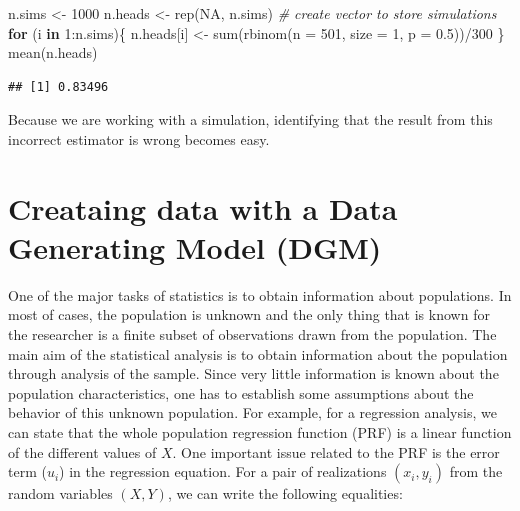 \documentclass[
]{book}
\newenvironment{Shaded}{\begin{snugshade}}{\end{snugshade}}
\newcommand{\AttributeTok}[1]{\textcolor[rgb]{0.77,0.63,0.00}{#1}}
\newcommand{\CommentTok}[1]{\textcolor[rgb]{0.56,0.35,0.01}{\textit{#1}}}
\newcommand{\ConstantTok}[1]{\textcolor[rgb]{0.00,0.00,0.00}{#1}}
\newcommand{\ControlFlowTok}[1]{\textcolor[rgb]{0.13,0.29,0.53}{\textbf{#1}}}
\newcommand{\DecValTok}[1]{\textcolor[rgb]{0.00,0.00,0.81}{#1}}
\newcommand{\FloatTok}[1]{\textcolor[rgb]{0.00,0.00,0.81}{#1}}
\newcommand{\FunctionTok}[1]{\textcolor[rgb]{0.00,0.00,0.00}{#1}}
\newcommand{\NormalTok}[1]{#1}
\newcommand{\OtherTok}[1]{\textcolor[rgb]{0.56,0.35,0.01}{#1}}
\newcommand{\SpecialCharTok}[1]{\textcolor[rgb]{0.00,0.00,0.00}{#1}}
\theoremstyle{definition}
\theoremstyle{definition}
\theoremstyle{definition}
\theoremstyle{definition}
\theoremstyle{remark}
\begin{document}
\begin{Shaded}
\begin{Highlighting}[]
\NormalTok{n.sims }\OtherTok{\textless{}{-}} \DecValTok{1000}
\NormalTok{n.heads }\OtherTok{\textless{}{-}} \FunctionTok{rep}\NormalTok{(}\ConstantTok{NA}\NormalTok{, n.sims) }\CommentTok{\# create vector to store simulations}
\ControlFlowTok{for}\NormalTok{ (i }\ControlFlowTok{in} \DecValTok{1}\SpecialCharTok{:}\NormalTok{n.sims)\{}
\NormalTok{  n.heads[i] }\OtherTok{\textless{}{-}} \FunctionTok{sum}\NormalTok{(}\FunctionTok{rbinom}\NormalTok{(}\AttributeTok{n =} \DecValTok{501}\NormalTok{, }\AttributeTok{size =} \DecValTok{1}\NormalTok{, }\AttributeTok{p =} \FloatTok{0.5}\NormalTok{))}\SpecialCharTok{/}\DecValTok{300}
\NormalTok{\}}
\FunctionTok{mean}\NormalTok{(n.heads)}
\end{Highlighting}
\end{Shaded}

\begin{verbatim}
## [1] 0.83496
\end{verbatim}

Because we are working with a simulation, identifying that the result from this incorrect estimator is wrong becomes easy.

\hypertarget{creataing-data-with-a-data-generating-model-dgm}{%
\section{Creataing data with a Data Generating Model (DGM)}\label{creataing-data-with-a-data-generating-model-dgm}}

One of the major tasks of statistics is to obtain information about populations. In most of cases, the population is unknown and the only thing that is known for the researcher is a finite subset of observations drawn from the population. The main aim of the statistical analysis is to obtain information about the population through analysis of the sample. Since very little information is known about the population characteristics, one has to establish some assumptions about the behavior of this unknown population. For example, for a regression analysis, we can state that the whole population regression function (PRF) is a linear function of the different values of \(X\). One important issue related to the PRF is the error term (\(u_i\)) in the regression equation. For a pair of realizations \((x_i,y_i)\) from the random variables \((X,Y)\), we can write the following equalities:
\end{document}
